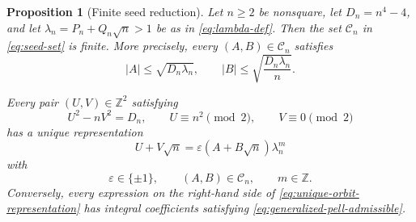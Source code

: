 \documentclass[a4paper,11pt]{amsart}
\newtheorem{proposition}[proposition]{Proposition}
\theoremstyle{definition}
\theoremstyle{remark}
\newcommand{\Z}{\mathbb Z}
\newcommand{\eps}{\varepsilon}
\begin{document}
\begin{proposition}[Finite seed reduction]\label{prop:seed-reduction}
Let $n\ge2$ be nonsquare, let $D_n=n^4-4$, and let $\lambda_n=P_n+Q_n\sqrt n>1$ be as in \eqref{eq:lambda-def}.  Then the set $\mathcal C_n$ in \eqref{eq:seed-set} is finite.  More precisely, every $(A,B)\in\mathcal C_n$ satisfies
\begin{equation}\label{eq:seed-bounds}
|A|\le\sqrt{D_n\lambda_n},
\qquad
|B|\le\sqrt{\frac{D_n\lambda_n}{n}}.
\end{equation}

Every pair $(U,V)\in\Z^2$ satisfying
\begin{equation}\label{eq:generalized-pell-admissible}
U^2-nV^2=D_n,
\qquad
U\equiv n^2\pmod2,
\qquad
V\equiv0\pmod2
\end{equation}
has a unique representation
\begin{equation}\label{eq:unique-orbit-representation}
U+V\sqrt n
 =\eps(A+B\sqrt n)\lambda_n^m
\end{equation}
with
\[
\eps\in\{\pm1\},
\qquad (A,B)\in\mathcal C_n,
\qquad m\in\Z.
\]
Conversely, every expression on the right-hand side of \eqref{eq:unique-orbit-representation} has integral coefficients satisfying \eqref{eq:generalized-pell-admissible}.
\end{proposition}
\end{document}
